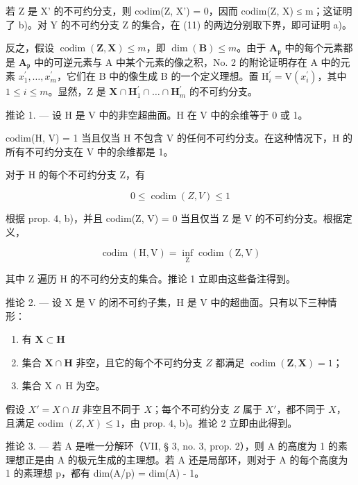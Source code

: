 若 Z 是 X' 的不可约分支，则 codim(Z, X') = 0，因而 codim(Z, X) ≤ m；这证明了 b)。对 Y 的不可约分支 Z 的集合，在 (11) 的两边分别取下界，即可证明 a)。

反之，假设 \(\operatorname{codim}(\mathbf{Z},\mathbf{X})\leqslant m\)，即 \(\dim (\mathbf{B})\leqslant m\)。由于 \(\mathbf{A}_{\mathfrak{p}}\) 中的每个元素都是 \(\mathbf{A}_{\mathfrak{p}}\) 中的可逆元素与 A 中某个元素的像之积，No. 2 的附论证明存在 A 中的元素 \(x_1^{\prime},\ldots ,x_m^\prime\)，它们在 B 中的像生成 B 的一个定义理想。置 \(\mathrm{H}_i^{\prime} = \mathrm{V}(x_i^{\prime})\)，其中 \(1\leqslant i\leqslant m\)。显然，Z 是 \(\mathbf{X}\cap \mathbf{H}_1^{\prime}\cap \dots \cap \mathbf{H}_m^{\prime}\) 的不可约分支。

推论 1. --- 设 H 是 V 中的非空超曲面。H 在 V 中的余维等于 0 或 1。

codim(H, V) = 1 当且仅当 H 不包含 V 的任何不可约分支。在这种情况下，H 的所有不可约分支在 V 中的余维都是 1。

对于 H 的每个不可约分支 Z，有

\[
0 \leqslant \operatorname{codim} (Z, V) \leqslant 1
\]

根据 prop. 4, b)，并且 codim(Z, V) = 0 当且仅当 Z 是 V 的不可约分支。根据定义，

\[
\operatorname{codim} (\mathrm{H}, \mathrm{V}) = \inf _ {\mathrm{Z}} \operatorname{codim} (\mathrm{Z}, \mathrm{V})
\]

其中 Z 遍历 H 的不可约分支的集合。推论 1 立即由这些备注得到。

推论 2. --- 设 X 是 V 的闭不可约子集，H 是 V 中的超曲面。只有以下三种情形：

\begin{enumerate}
\def\labelenumi{\arabic{enumi})}
\item
  有 \(\mathbf{X}\subset \mathbf{H}\)
\item
  集合 \(\mathbf{X} \cap \mathbf{H}\) 非空，且它的每个不可约分支 \(Z\) 都满足 \(\operatorname{codim}(\mathbf{Z}, \mathbf{X}) = 1\)；
\item
  集合 X ∩ H 为空。
\end{enumerate}

假设 \(X' = X \cap H\) 非空且不同于 \(X\)；每个不可约分支 \(Z\) 属于 \(X'\)，都不同于 \(X\)，且满足 codim \((Z, X) \leqslant 1\)，由 prop. 4, b)。推论 2 立即由此得到。

推论 3. --- 若 A 是唯一分解环（VII, § 3, no. 3, prop. 2），则 A 的高度为 1 的素理想正是由 A 的极元生成的主理想。若 A 还是局部环，则对于 A 的每个高度为 1 的素理想 p，都有 dim(A/p) = dim(A) - 1。

